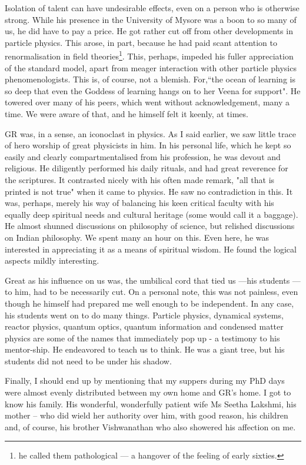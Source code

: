 Isolation of talent can have undesirable effects, even on a person who is otherwise strong. While his presence in the University of Mysore was a boon to so many of us, he did have to pay a price. He got rather cut off from other developments in particle physics. This arose, in part, because he had paid scant attention to renormalisation in field theories\footnote{he called them pathological --- a hangover of the feeling of early sixties.}. This, perhaps, impeded his fuller appreciation of the standard model, apart from meager interaction with other particle physics phenomenologists. This is, of course, not a blemish. For,``the ocean of learning is so deep that even the Goddess of learning hangs on to her Veena for support". He towered over many of his peers, which went without acknowledgement, many a time. We were aware of that, and he himself felt it keenly, at times.

GR was, in a sense, an iconoclast in physics. As I said earlier, we saw little trace of hero worship of great physicists in him. In his personal life, which he kept so easily and clearly compartmentalised from his profession, he was devout and religious. He diligently performed his daily rituals, and had great reverence for the scriptures. It contrasted nicely with his often made remark, "all that is printed is not true" when it came to physics. He saw no contradiction in this. It was, perhaps, merely his way of balancing his keen critical faculty with his equally deep spiritual needs and cultural heritage (some would call it a baggage).  He almost shunned discussions on philosophy of science, but relished discussions on Indian philosophy. We spent many an hour on this. Even here, he was interested in appreciating it as a means of spiritual wisdom. He found the logical aspects mildly interesting.

Great as his influence on us was, the umbilical cord that tied us ---his students ---to him, had to be necessarily cut. On a personal note, this was not painless, even though he himself had prepared me well enough to be independent. In any case, his students went on to do many things. Particle physics, dynamical systems, reactor physics, quantum optics, quantum information and condensed matter physics are some of the names that immediately pop up - a testimony to his mentor-ship. He endeavored to teach us to think. He was a giant tree, but his students did not need to be under his shadow.

Finally, I should end up by mentioning that my suppers during my PhD days were almost evenly distributed between my own home and GR's home. I got to know his family. His wonderful, wonderfully patient wife Ms Seetha Lakshmi, his mother -- who did wield her authority over him, with good reason, his children and, of course, his brother Vishwanathan who also showered his affection on me.

